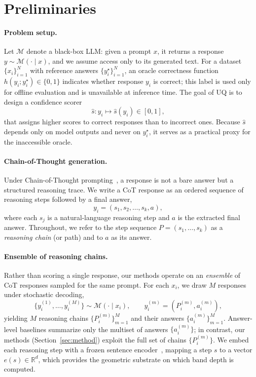 \documentclass[twoside]{article}
\begin{document}
\section{Preliminaries}
\label{sec:prelim}

\paragraph{Problem setup.}
Let $\mathcal{M}$ denote a black-box LLM: given a prompt $x$, it returns a
response $y \sim \mathcal{M}(\cdot \mid x)$, and we assume access only to its
generated text. For a dataset
$\{x_i\}_{i=1}^{N}$ with reference answers $\{y_i^\star\}_{i=1}^{N}$, an oracle
correctness function $h(y_i; y_i^\star) \in \{0, 1\}$ indicates whether response
$y_i$ is correct; this label is used only for offline evaluation and is
unavailable at inference time. The goal of UQ is to design a confidence scorer
\begin{equation}
  \hat{s}: y_i \mapsto \hat{s}(y_i)\in[0,1],
\end{equation}
that assigns higher scores to correct responses than to incorrect ones.
Because $\hat{s}$ depends only on model outputs and never on $y_i^\star$, it
serves as a practical proxy for the inaccessible oracle.

\paragraph{Chain-of-Thought generation.}
Under Chain-of-Thought prompting~\citep{wei2022chain}, a response is not a
bare answer but a structured reasoning trace. We write a CoT response as an
ordered sequence of reasoning steps followed by a final answer,
\begin{equation}
  y_i = (s_1, s_2, \ldots, s_k, a),
\end{equation}
where each $s_j$ is a natural-language reasoning step and $a$ is the extracted
final answer. Throughout, we refer to the step sequence
$P = (s_1, \ldots, s_k)$ as a \emph{reasoning chain} (or path) and to $a$ as its
answer.

\paragraph{Ensemble of reasoning chains.}
Rather than scoring a single response, our methods operate on an \emph{ensemble}
of CoT responses sampled for the same prompt. For each $x_i$, we draw $M$
responses under stochastic decoding,
\begin{equation}
  \{ y_i^{(1)}, \ldots, y_i^{(M)} \} \sim \mathcal{M}(\cdot \mid x_i),
  \qquad
  y_i^{(m)} = (P_i^{(m)}, a_i^{(m)}),
\end{equation}
yielding $M$ reasoning chains $\{P_i^{(m)}\}_{m=1}^{M}$ and their answers
$\{a_i^{(m)}\}_{m=1}^{M}$. Answer-level baselines summarize only the multiset of
answers $\{a_i^{(m)}\}$; in contrast, our methods (Section~\ref{sec:method})
exploit the full set of chains $\{P_i^{(m)}\}$. We embed each reasoning step with
a frozen sentence encoder~\citep{reimers2019sentencebert}, mapping a step $s$ to
a vector $e(s) \in \mathbb{R}^d$, which provides the geometric substrate on
which band depth is computed.
\end{document}

